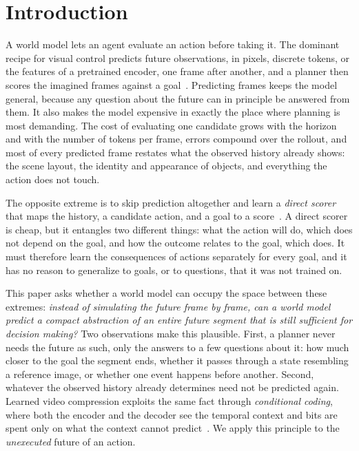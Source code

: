 \section{Introduction}
\label{sec:intro}

A world model lets an agent evaluate an action before taking it.
The dominant recipe for visual control predicts future observations, in pixels, discrete tokens, or the features of a pretrained encoder, one frame after another, and a planner then scores the imagined frames against a goal~\cite{hafner2019planet,micheli2023iris,zhou2025dinowm,assran2025vjepa2}.
Predicting frames keeps the model general, because any question about the future can in principle be answered from them.
It also makes the model expensive in exactly the place where planning is most demanding.
The cost of evaluating one candidate grows with the horizon and with the number of tokens per frame, errors compound over the rollout, and most of every predicted frame restates what the observed history already shows: the scene layout, the identity and appearance of objects, and everything the action does not touch.

The opposite extreme is to skip prediction altogether and learn a \emph{direct scorer} that maps the history, a candidate action, and a goal to a score~\cite{nakamoto2024vgps}.
A direct scorer is cheap, but it entangles two different things: what the action will do, which does not depend on the goal, and how the outcome relates to the goal, which does.
It must therefore learn the consequences of actions separately for every goal, and it has no reason to generalize to goals, or to questions, that it was not trained on.

This paper asks whether a world model can occupy the space between these extremes: \emph{instead of simulating the future frame by frame, can a world model predict a compact abstraction of an entire future segment that is still sufficient for decision making?}
Two observations make this plausible.
First, a planner never needs the future as such, only the answers to a few questions about it: how much closer to the goal the segment ends, whether it passes through a state resembling a reference image, or whether one event happens before another.
Second, whatever the observed history already determines need not be predicted again.
Learned video compression exploits the same fact through \emph{conditional coding}, where both the encoder and the decoder see the temporal context and bits are spent only on what the context cannot predict~\cite{li2021dcvc}.
We apply this principle to the \emph{unexecuted} future of an action.

